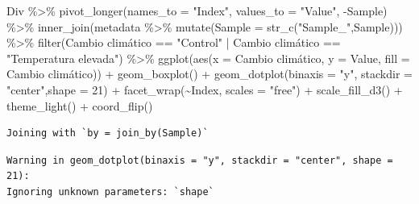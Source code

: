 \documentclass[
  letterpaper,
  DIV=11,
  numbers=noendperiod]{scrartcl}
\newenvironment{Shaded}{\begin{snugshade}}{\end{snugshade}}
\newcommand{\AttributeTok}[1]{\textcolor[rgb]{0.40,0.45,0.13}{#1}}
\newcommand{\DecValTok}[1]{\textcolor[rgb]{0.68,0.00,0.00}{#1}}
\newcommand{\FunctionTok}[1]{\textcolor[rgb]{0.28,0.35,0.67}{#1}}
\newcommand{\NormalTok}[1]{\textcolor[rgb]{0.00,0.23,0.31}{#1}}
\newcommand{\SpecialCharTok}[1]{\textcolor[rgb]{0.37,0.37,0.37}{#1}}
\newcommand{\StringTok}[1]{\textcolor[rgb]{0.13,0.47,0.30}{#1}}
\begin{document}
\begin{Shaded}
\begin{Highlighting}[]
\NormalTok{Div }\SpecialCharTok{\%\textgreater{}\%} 
  \FunctionTok{pivot\_longer}\NormalTok{(}\AttributeTok{names\_to =} \StringTok{"Index"}\NormalTok{, }\AttributeTok{values\_to =} \StringTok{"Value"}\NormalTok{, }\SpecialCharTok{{-}}\NormalTok{Sample) }\SpecialCharTok{\%\textgreater{}\%} 
  \FunctionTok{inner\_join}\NormalTok{(metadata }\SpecialCharTok{\%\textgreater{}\%} 
               \FunctionTok{mutate}\NormalTok{(}\AttributeTok{Sample =} \FunctionTok{str\_c}\NormalTok{(}\StringTok{"Sample\_"}\NormalTok{,Sample))) }\SpecialCharTok{\%\textgreater{}\%} 
  \FunctionTok{filter}\NormalTok{(}\StringTok{\textasciigrave{}}\AttributeTok{Cambio climático}\StringTok{\textasciigrave{}} \SpecialCharTok{==} \StringTok{"Control"} \SpecialCharTok{|} \StringTok{\textasciigrave{}}\AttributeTok{Cambio climático}\StringTok{\textasciigrave{}} \SpecialCharTok{==} \StringTok{"Temperatura elevada"}\NormalTok{) }\SpecialCharTok{\%\textgreater{}\%} 
  \FunctionTok{ggplot}\NormalTok{(}\FunctionTok{aes}\NormalTok{(}\AttributeTok{x =} \StringTok{\textasciigrave{}}\AttributeTok{Cambio climático}\StringTok{\textasciigrave{}}\NormalTok{, }\AttributeTok{y =}\NormalTok{ Value, }\AttributeTok{fill =} \StringTok{\textasciigrave{}}\AttributeTok{Cambio climático}\StringTok{\textasciigrave{}}\NormalTok{)) }\SpecialCharTok{+} 
  \FunctionTok{geom\_boxplot}\NormalTok{() }\SpecialCharTok{+} 
  \FunctionTok{geom\_dotplot}\NormalTok{(}\AttributeTok{binaxis =} \StringTok{"y"}\NormalTok{, }\AttributeTok{stackdir =} \StringTok{"center"}\NormalTok{,}\AttributeTok{shape =} \DecValTok{21}\NormalTok{) }\SpecialCharTok{+}
  \FunctionTok{facet\_wrap}\NormalTok{(}\SpecialCharTok{\textasciitilde{}}\NormalTok{Index, }\AttributeTok{scales =} \StringTok{"free"}\NormalTok{) }\SpecialCharTok{+}
  \FunctionTok{scale\_fill\_d3}\NormalTok{() }\SpecialCharTok{+} 
  \FunctionTok{theme\_light}\NormalTok{() }\SpecialCharTok{+} \FunctionTok{coord\_flip}\NormalTok{()}
\end{Highlighting}
\end{Shaded}

\begin{verbatim}
Joining with `by = join_by(Sample)`
\end{verbatim}

\begin{verbatim}
Warning in geom_dotplot(binaxis = "y", stackdir = "center", shape = 21):
Ignoring unknown parameters: `shape`
\end{verbatim}
\end{document}
